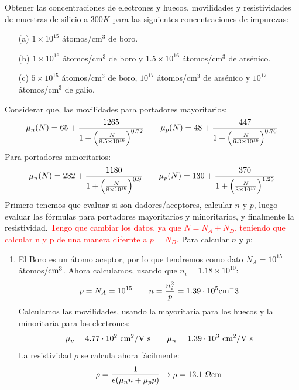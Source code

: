 
\begin{texercise}
	Obtener las concentraciones de electrones y huecos, movilidades y resistividades de muestras de silicio a \(300 K\) para las siguientes concentraciones de impurezas:
	\begin{itemize}
		\item[(a)] \(1 \times 10^{15}\) átomos/cm$^3$ de boro.
		\item[(b)] \(1 \times 10^{16}\) átomos/cm$^3$ de boro y \(1.5 \times 10^{16}\) átomos/cm$^3$ de arsénico.
		\item[(c)] \(5 \times 10^{15}\) átomos/cm$^3$ de boro, \(10^{17}\) átomos/cm$^3$ de arsénico y \(10^{17}\) átomos/cm$^3$ de galio.
	\end{itemize}
	Considerar que, las movilidades para portadores mayoritarios:
	\begin{equation}
		\mu_n (N) = 65  + \frac{1265}{1+\left( \frac{N}{8.5\times 10^{16}} \right)^{0.72}} \qquad 
		\mu_p (N) = 48  + \frac{447}{1+\left( \frac{N}{6.3\times 10^{16}} \right)^{0.76}}
	\end{equation}
	Para portadores minoritarios:
	\begin{equation}
		\mu_n (N) = 232  + \frac{1180}{1+\left( \frac{N}{8\times 10^{16}} \right)^{0.9}} \qquad 
		\mu_p (N) = 130  + \frac{370}{1+\left( \frac{N}{8\times 10^{17}} \right)^{1.25}}
	\end{equation}
	\tcblower
	Primero tenemos que evaluar si son dadores/aceptores, calcular $n$ y $p$, luego evaluar las fórmulas para portadores mayoritarios y minoritarios, y finalmente la resistividad. \textcolor{red}{Tengo que cambiar los datos, ya que $N=N_A+N_D$, teniendo que calcular n y p de una manera difernte a $p=N_D$.}  Para calcular $n$ y $p$:
	\begin{enumerate}[label=\alph*)]
		\item El Boro es un átomo aceptor, por lo que tendremos como dato $N_A=10^{15} \ $átomos/$\text{cm}^3$. Ahora calculamos, usando que $n_i=1.18\times 10^{10}$:   
		\begin{equation}
			p = N_A = 10^{15} \qquad n = \frac{n_i^2}{p} =1.39 \cdot 10^5 \text{cm}^-3
		\end{equation}
		Calculamos las movilidades, usando la mayoritaria para los huecos y la minoritaria para los electrones:
		\begin{equation}
			\mu_p=4.77\cdot 10^2  \ \cm^2 /  \text{V s} \qquad 
			\mu_n=1.39 \cdot 10^3 \ \cm^2 /  \text{V s}
		\end{equation}
		La resistividad $\rho$ se calcula ahora fácilmente:
		\begin{equation}
			\rho = \frac{1}{e(\mu_n n + \mu_pp)} \rightarrow 
			\rho = 13.1 \ \Omega \text{cm}
		\end{equation}


\end{enumerate}
\end{texercise}
